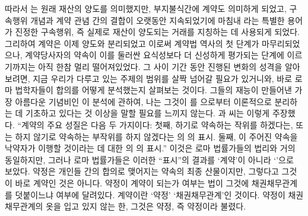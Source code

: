 따라서 는 원래 재산의 양도를 의미했지만,
부지불식간에 계약도 의미하게 되었고,
구속행위 개념과 계약 관념 간의 결합이 오랫동안 지속되었기에
마침내
라는 특별한 용어가
진정한 구속행위, 즉 실제로 재산이 양도되는 거래를 지칭하는 데
사용되게 되었다.
그리하여 계약은 이제 양도와 분리되었고
이로써 계약법 역사의 첫 단계가 마무리되었으나,
계약당사자의 약속이 이를 둘러싼 요식성보다 더 신성하게 평가되는
단계에 이르기까지는 아직 한참 멀리 떨어져있었다.
그 사이 기간 동안 진행된 변화의 성격을 알아보려면,
지금 우리가 다루고 있는 주제의 범위를 살짝 넘어갈 필요가 있거니와,
바로 로마 법학자들이 합의를 어떻게 분석했는지
살펴보는 것이다.
그들의 재능이 만들어낸 가장 아름다운 기념비인
이 분석에 관하여, 나는
그것이 를 으로부터
이론적으로 분리하는 데 기초하고 있다는 것 이상을 말할
필요를 느끼지 않는다.
과  씨는 이렇게 주장했다.
``계약의 주요 성질은 다음 두 가지이다:
첫째,
하기로 약속하는 작위를 하겠다는,
또는
하지 않기로 약속하는 부작위를 하지 않겠다는
의
의 표시.
둘째,
이 주어진 약속을 낙약자가 이행할 것이라는 데 대한
의
의 표시.''
이것은
로마 법률가들의 법리와 거의 동일하지만,
그러나 로마 법률가들은
이러한 ``표시''의 결과를 `계약'이 아니라
`'으로 보았다.
약정은 개인들 간의 합의로 맺어지는 약속의 최종 산물이지만,
그렇다고 그것이 바로 계약인 것은 아니다.
약정이 계약이 되는가 여부는
법이 그것에 채권채무관계를 덧붙이느냐 여부에 달려있다.
계약이란 `약정'  `채권채무관계'인 것이다.
약정이 채권채무관계의 옷을 입고 있지 않는 한,
%
그것은 약정, 즉  약정이라 불렸다.

